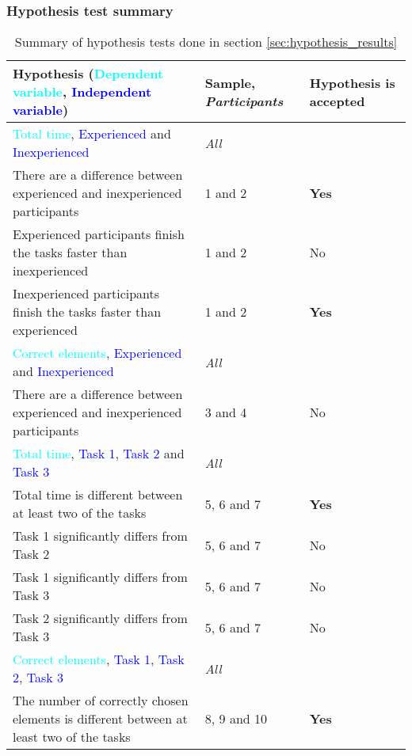 \subsubsection{Hypothesis test summary}

	\begin{longtable}{p{}|p{}|p{}}  %
	\caption[Summary, normality tests]{Summary of hypothesis tests done in section \ref{sec:hypothesis_results}} \label{tab:hypothesistest_summary} \\
		Hypothesis (\textcolor{cyan}{Dependent variable}, \textcolor{blue}{Independent variable}) & Sample, \textit{Participants} & Hypothesis is accepted \\[0.2cm] \hline
		\textcolor{cyan}{Total time}, \textcolor{blue}{Experienced} and \textcolor{blue}{Inexperienced} & \textit{All} &  \\
		There are a difference between experienced and inexperienced participants & 1 and 2 & \textbf{Yes} \\
		Experienced participants finish the tasks faster than inexperienced  & 1 and 2 & No   \\ 
		Inexperienced participants finish the tasks faster than experienced  & 1 and 2 & \textbf{Yes}   \\ \hline
		\textcolor{cyan}{Correct elements}, \textcolor{blue}{Experienced} and \textcolor{blue}{Inexperienced} & \textit{All} &  \\
		There are a difference between experienced and inexperienced participants & 3 and 4 & No   \\ \hline
		\textcolor{cyan}{Total time}, \textcolor{blue}{Task 1}, \textcolor{blue}{Task 2} and \textcolor{blue}{Task 3}& \textit{All} &  \\
		 Total time is different between at least two of the tasks & 5, 6 and 7 & \textbf{Yes}   \\
		 Task 1 significantly differs from Task 2 & 5, 6 and 7 & No  \\ 
		 Task 1 significantly differs from Task 3 & 5, 6 and 7 & No  \\ 
		 Task 2 significantly differs from Task 3 & 5, 6 and 7 & No  \\ \hline
		\textcolor{cyan}{Correct elements}, \textcolor{blue}{Task 1}, \textcolor{blue}{Task 2}, \textcolor{blue}{Task 3} & \textit{All} &  \\
		The number of correctly chosen elements is different between at least two of the tasks & 8, 9 and 10 & \textbf{Yes}  \\

\end{longtable}
